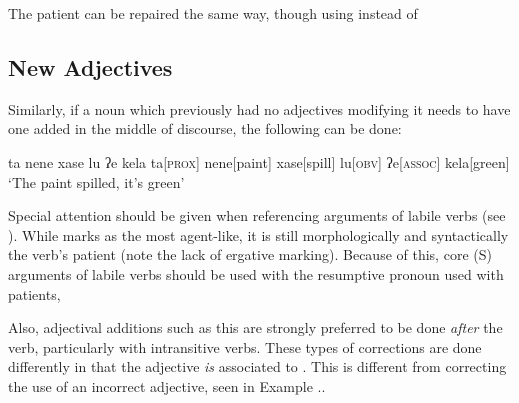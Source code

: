 The patient can be repaired the same way, though using  instead of 
\subsection{New Adjectives}
Similarly, if a noun which previously had no adjectives modifying it needs to have one added in the middle of discourse, the following can be done:

\ex
\begingl
\glpreamble ta nene xase lu ʔe kela
\endpreamble
ta[\textsc{prox}]
nene[paint]
xase[spill]
lu[\textsc{obv}]
ʔe[\textsc{assoc}]
kela[green]
\glft `The paint spilled, it's green'
\endgl
\xe


Special attention should be given when referencing arguments of labile verbs (see ). While  marks  as the most agent-like, it is still morphologically and syntactically the verb's patient (note the lack of ergative marking). Because of this, core (S) arguments of labile verbs should be used with the resumptive pronoun used with patients, 

Also, adjectival additions such as this are strongly preferred to be done \textit{after} the verb, particularly with intransitive verbs. These types of corrections are done differently in that the adjective \textit{is} associated to . This is different from correcting the use of an incorrect adjective, seen in Example ..